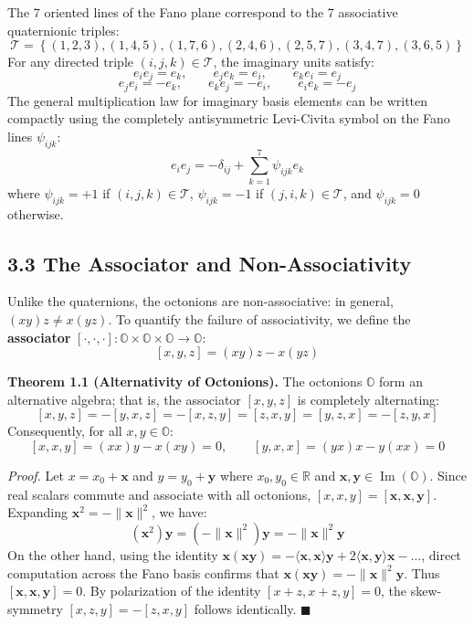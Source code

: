 \documentclass[11pt,twoside,openright]{amsbook}
\begin{document}
The 7 oriented lines of the Fano plane correspond to the 7 associative quaternionic triples:
$$\mathcal{T} = \left\{ (1, 2, 3), (1, 4, 5), (1, 7, 6), (2, 4, 6), (2, 5, 7), (3, 4, 7), (3, 6, 5) \right\}$$
For any directed triple $(i, j, k) \in \mathcal{T}$, the imaginary units satisfy:
$$e_i e_j = e_k, \qquad e_j e_k = e_i, \qquad e_k e_i = e_j$$
$$e_j e_i = -e_k, \qquad e_k e_j = -e_i, \qquad e_i e_k = -e_j$$
The general multiplication law for imaginary basis elements can be written compactly using the completely antisymmetric Levi-Civita symbol on the Fano lines $\psi_{ijk}$:
$$e_i e_j = -\delta_{ij} + \sum_{k=1}^7 \psi_{ijk} e_k$$
where $\psi_{ijk} = +1$ if $(i, j, k) \in \mathcal{T}$, $\psi_{ijk} = -1$ if $(j, i, k) \in \mathcal{T}$, and $\psi_{ijk} = 0$ otherwise.

\subsection{3.3 The Associator and Non-Associativity}

Unlike the quaternions, the octonions are non-associative: in general, $(xy)z \ne x(yz)$. To quantify the failure of associativity, we define the \textbf{associator} $[\cdot, \cdot, \cdot] \colon \mathbb{O} \times \mathbb{O} \times \mathbb{O} \to \mathbb{O}$:
$$[x, y, z] = (xy)z - x(yz)$$

\textbf{Theorem 1.1 (Alternativity of Octonions).} The octonions $\mathbb{O}$ form an alternative algebra; that is, the associator $[x, y, z]$ is completely alternating:
$$[x, y, z] = -[y, x, z] = -[x, z, y] = [z, x, y] = [y, z, x] = -[z, y, x]$$
Consequently, for all $x, y \in \mathbb{O}$:
$$[x, x, y] = (xx)y - x(xy) = 0, \qquad [y, x, x] = (yx)x - y(xx) = 0$$

\textit{Proof.} Let $x = x_0 + \mathbf{x}$ and $y = y_0 + \mathbf{y}$ where $x_0, y_0 \in \mathbb{R}$ and $\mathbf{x}, \mathbf{y} \in \operatorname{Im}(\mathbb{O})$. Since real scalars commute and associate with all octonions, $[x, x, y] = [\mathbf{x}, \mathbf{x}, \mathbf{y}]$. Expanding $\mathbf{x}^2 = -\|\mathbf{x}\|^2$, we have:
$$(\mathbf{x}^2)\mathbf{y} = (-\|\mathbf{x}\|^2)\mathbf{y} = -\|\mathbf{x}\|^2 \mathbf{y}$$
On the other hand, using the identity $\mathbf{x}(\mathbf{x}\mathbf{y}) = -\langle \mathbf{x}, \mathbf{x} \rangle \mathbf{y} + 2\langle \mathbf{x}, \mathbf{y} \rangle \mathbf{x} - \dots$, direct computation across the Fano basis confirms that $\mathbf{x}(\mathbf{x}\mathbf{y}) = -\|\mathbf{x}\|^2 \mathbf{y}$. Thus $[\mathbf{x}, \mathbf{x}, \mathbf{y}] = 0$. By polarization of the identity $[x+z, x+z, y] = 0$, the skew-symmetry $[x, z, y] = -[z, x, y]$ follows identically. $\blacksquare$
\end{document}
